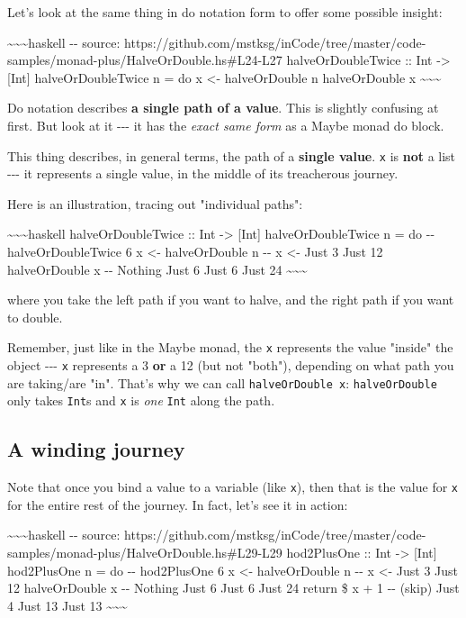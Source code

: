 \documentclass[]{article}
\begin{document}
Let's look at the same thing in do notation form to offer some possible insight:

\textasciitilde{}\textasciitilde{}\textasciitilde{}haskell -\/- source:
https://github.com/mstksg/inCode/tree/master/code-samples/monad-plus/HalveOrDouble.hs\#L24-L27
halveOrDoubleTwice :: Int -\textgreater{} {[}Int{]} halveOrDoubleTwice n = do x
\textless{}- halveOrDouble n halveOrDouble x
\textasciitilde{}\textasciitilde{}\textasciitilde{}

Do notation describes \textbf{a single path of a value}. This is slightly
confusing at first. But look at it -\/-\/- it has the \emph{exact same form} as
a Maybe monad do block.

This thing describes, in general terms, the path of a \textbf{single value}.
\texttt{x} is \textbf{not} a list -\/-\/- it represents a single value, in the
middle of its treacherous journey.

Here is an illustration, tracing out "individual paths":

\textasciitilde{}\textasciitilde{}\textasciitilde{}haskell halveOrDoubleTwice ::
Int -\textgreater{} {[}Int{]} halveOrDoubleTwice n = do -\/- halveOrDoubleTwice
6 x \textless{}- halveOrDouble n -\/- x \textless{}- Just 3 Just 12
halveOrDouble x -\/- Nothing Just 6 Just 6 Just 24
\textasciitilde{}\textasciitilde{}\textasciitilde{}

where you take the left path if you want to halve, and the right path if you
want to double.

Remember, just like in the Maybe monad, the \texttt{x} represents the value
"inside" the object -\/-\/- \texttt{x} represents a 3 \textbf{or} a 12 (but not
"both"), depending on what path you are taking/are "in". That's why we can call
\texttt{halveOrDouble\ x}: \texttt{halveOrDouble} only takes \texttt{Int}s and
\texttt{x} is \emph{one} \texttt{Int} along the path.

\subsection{A winding journey}

Note that once you bind a value to a variable (like \texttt{x}), then that is
the value for \texttt{x} for the entire rest of the journey. In fact, let's see
it in action:

\textasciitilde{}\textasciitilde{}\textasciitilde{}haskell -\/- source:
https://github.com/mstksg/inCode/tree/master/code-samples/monad-plus/HalveOrDouble.hs\#L29-L29
hod2PlusOne :: Int -\textgreater{} {[}Int{]} hod2PlusOne n = do -\/- hod2PlusOne
6 x \textless{}- halveOrDouble n -\/- x \textless{}- Just 3 Just 12
halveOrDouble x -\/- Nothing Just 6 Just 6 Just 24 return \$ x + 1 -\/- (skip)
Just 4 Just 13 Just 13 \textasciitilde{}\textasciitilde{}\textasciitilde{}
\end{document}
